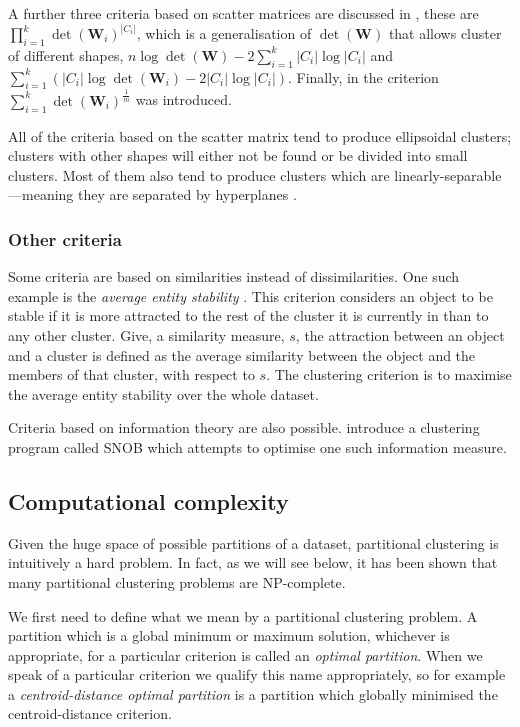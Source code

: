 \documentclass[a4paper]{report}
\begin{document}
A further three criteria based on scatter matrices are discussed in
\citep{marriott1982optimization}, these are
$\prod_{i=1}^{k}\det(\mathbf{W}_i)^{|C_i|}$, which is a generalisation of
$\det(\mathbf{W})$ that allows cluster of different shapes, $n
\log{\det(\mathbf{W})} - 2\sum_{i=1}^{k} |C_i| \log{|C_i|}$ and
$\sum_{i=1}^{k} (|C_i| \log{\det(\mathbf{W}_i)} - 2|C_i|\log{|C_i|})$.
Finally, in \citep{maronna1974} the criterion
$\sum_{i=1}^{k}\det(\mathbf{W}_i)^{\frac{1}{m}}$ was introduced.

All of the criteria based on the scatter matrix tend to produce ellipsoidal
clusters; clusters with other shapes will either not be found or be divided
into small clusters.  Most of them also tend to produce clusters which are
linearly-separable---meaning they are separated by hyperplanes
\citep{marriott1982optimization}.

\subsubsection{Other criteria}
\label{sec:other-criteria}

Some criteria are based on similarities instead of dissimilarities.  One such
example is the \textit{average entity stability} \citep{Rubin67optimal}.  This
criterion considers an object to be stable if it is more attracted to the rest
of the cluster it is currently in than to any other cluster.  Give, a
similarity measure, $s$, the attraction between an object and a cluster is
defined as the average similarity between the object and the members of that
cluster, with respect to $s$.  The clustering criterion is to maximise the
average entity stability over the whole dataset.

Criteria based on information theory are also possible.
\citet{wallace1968information} introduce a clustering program called SNOB
which attempts to optimise one such information measure.

\subsection{Computational complexity}
\label{sec:complexity-issues}

Given the huge space of possible partitions of a dataset, partitional
clustering is intuitively a hard problem.  In fact, as we will see below, it
has been shown that many partitional clustering problems are NP-complete.

We first need to define what we mean by a partitional clustering problem.  A
partition which is a global minimum or maximum solution, whichever is
appropriate, for a particular criterion is called an \textit{optimal
  partition}.  When we speak of a particular criterion we qualify this name
appropriately, so for example a \textit{centroid-distance optimal partition}
is a partition which globally minimised the centroid-distance criterion.
\end{document}
